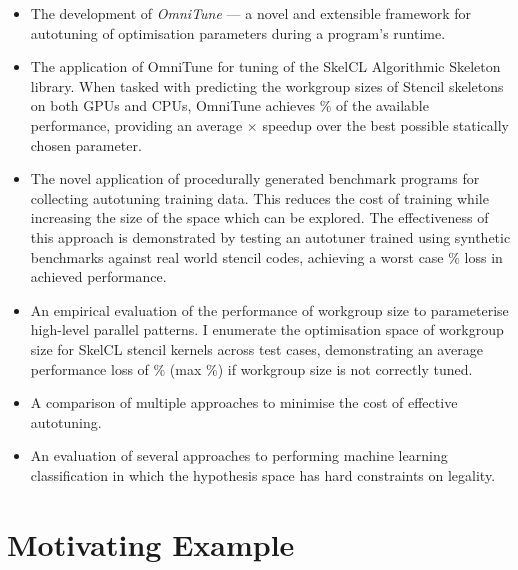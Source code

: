 \begin{itemize}
\item The development of \emph{OmniTune} --- a novel and extensible
  framework for autotuning of optimisation parameters during a
  program's runtime.
\item The application of OmniTune for tuning of the SkelCL Algorithmic
  Skeleton library. When tasked with predicting the workgroup sizes of
  Stencil skeletons on both GPUs and CPUs, OmniTune achieves
  $\%$ of the available
  performance, providing an average
  $\times$ speedup over the
  best possible statically chosen parameter.
\item The novel application of procedurally generated benchmark
  programs for collecting autotuning training data. This reduces the
  cost of training while increasing the size of the space which can be
  explored. The effectiveness of this approach is demonstrated by
  testing an autotuner trained using synthetic benchmarks against
   real world stencil codes, achieving a
  worst case
  $\%$
  loss in achieved performance.
\item An empirical evaluation of the performance of workgroup size to
  parameterise high-level parallel patterns. I enumerate the
  optimisation space of workgroup size for SkelCL stencil kernels
  across  test cases, demonstrating an
  average performance loss of
  $\%$ (max
  $\%$) if workgroup size is not
  correctly tuned. %
\item A comparison of multiple approaches to minimise the cost of
  effective autotuning. 
\item An evaluation of several approaches to performing machine
  learning classification in which the hypothesis space has hard
  constraints on legality. 
\end{itemize}


\section{Motivating Example}

